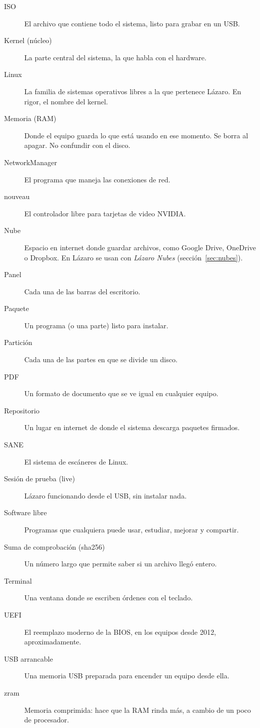 \begin{description}
  \item[ISO] El archivo que contiene todo el sistema, listo para grabar en
    un USB.
  \item[Kernel (núcleo)] La parte central del sistema, la que habla con el
    hardware.
  \item[Linux] La familia de sistemas operativos libres a la que pertenece
    Lázaro. En rigor, el nombre del kernel.
  \item[Memoria (RAM)] Donde el equipo guarda lo que está usando en ese
    momento. Se borra al apagar. No confundir con el disco.
  \item[NetworkManager] El programa que maneja las conexiones de red.
  \item[nouveau] El controlador libre para tarjetas de video NVIDIA.
  \item[Nube] Espacio en internet donde guardar archivos, como Google
    Drive, OneDrive o Dropbox. En Lázaro se usan con \emph{Lázaro Nubes}
    (sección~\ref{sec:nubes}).
  \item[Panel] Cada una de las barras del escritorio.
  \item[Paquete] Un programa (o una parte) listo para instalar.
  \item[Partición] Cada una de las partes en que se divide un disco.
  \item[PDF] Un formato de documento que se ve igual en cualquier equipo.
  \item[Repositorio] Un lugar en internet de donde el sistema descarga
    paquetes firmados.
  \item[SANE] El sistema de escáneres de Linux.
  \item[Sesión de prueba (live)] Lázaro funcionando desde el USB, sin
    instalar nada.
  \item[Software libre] Programas que cualquiera puede usar, estudiar,
    mejorar y compartir.
  \item[Suma de comprobación (sha256)] Un número largo que permite saber si
    un archivo llegó entero.
  \item[Terminal] Una ventana donde se escriben órdenes con el teclado.
  \item[UEFI] El reemplazo moderno de la BIOS, en los equipos desde 2012,
    aproximadamente.
  \item[USB arrancable] Una memoria USB preparada para encender un equipo
    desde ella.
  \item[zram] Memoria comprimida: hace que la RAM rinda más, a cambio de un
    poco de procesador.
\end{description}
